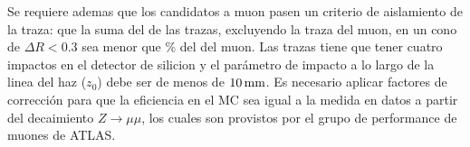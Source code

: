 
Se requiere ademas que los candidatos a muon pasen un criterio de aislamiento de
la traza: que la suma del {\pt} de las trazas, excluyendo la traza del muon, en
un cono de $\Delta R < 0.3$ sea menor que \unit[12]{\%} del {\pt} del muon. Las
trazas tiene que tener cuatro impactos en el detector de silicion y el parámetro
de impacto a lo largo de la linea del haz ($z_{0}$) debe ser de menos de
$\unit[10]{mm}$.
Es necesario aplicar factores de corrección para que la eficiencia en el MC
sea igual a la medida en datos a partir del decaimiento $Z\to\mu\mu$, los
cuales son provistos por el grupo de performance de muones de ATLAS.



